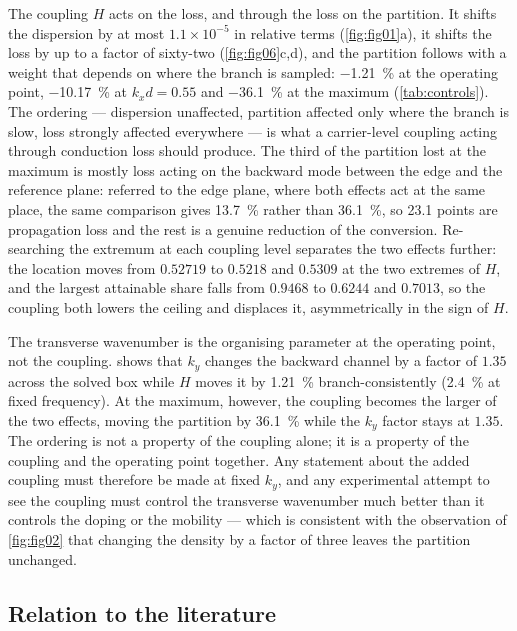 The coupling $H$ acts on the loss, and through the loss on the partition.  It
shifts the dispersion by at most $1.1\times10^{-5}$ in relative terms
(\cref{fig:fig01}a), it shifts the loss by up to a factor of sixty-two
(\cref{fig:fig06}c,d), and the partition follows with a weight that depends on
where the branch is sampled: \SI{-1.21}{\percent} at the operating point,
\SI{-10.17}{\percent} at $k_xd=0.55$ and \SI{-36.1}{\percent} at the maximum (\cref{tab:controls}).  The ordering --- dispersion unaffected,
partition affected only where the branch is slow, loss strongly affected
everywhere --- is what a carrier-level coupling acting through conduction loss
should produce.  The third of the partition lost at the maximum is mostly
loss acting on the backward mode between the edge and the reference plane:
referred to the edge plane, where both effects act at the same place, the same
comparison gives \SI{13.7}{\percent} rather than \SI{36.1}{\percent}, so
\SI{23.1}{} points are propagation loss and the rest is a genuine reduction of
the conversion.  Re-searching the extremum at each coupling level separates the
two effects further: the location moves from $0.52719$ to $0.5218$ and $0.5309$
at the two extremes of $H$, and the largest attainable share falls from $0.9468$
to $0.6244$ and $0.7013$, so the coupling both lowers the ceiling and displaces
it, asymmetrically in the sign of $H$.

The transverse wavenumber is the organising parameter at the operating point,
not the coupling.   shows that $k_y$ changes the backward
channel by a factor of $1.35$ across the solved box while $H$ moves it by
\SI{1.21}{\percent} branch-consistently (\SI{2.4}{\percent} at fixed frequency).
At the maximum, however, the coupling becomes the larger of the two
effects, moving the partition by \SI{36.1}{\percent} while the $k_y$ factor
stays at $1.35$.  The ordering is not a property of the coupling alone; it is a
property of the coupling and the operating point together.
Any statement about the added coupling must therefore be made at fixed $k_y$,
and any experimental attempt to see the coupling must control the transverse
wavenumber much better than it controls the doping or the mobility --- which is
consistent with the observation of \cref{fig:fig02} that changing the density by
a factor of three leaves the partition unchanged.

\subsection{Relation to the literature}
\label{sec:disc_literature}

